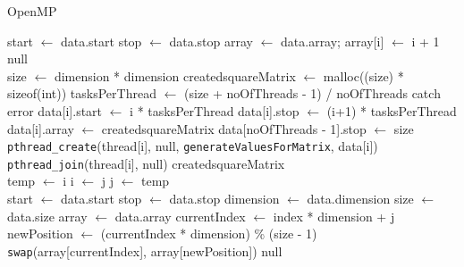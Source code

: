 \documentclass[10pt,twocolumn]{witseiepaper}
\begin{document}
\begin{appendix}
\begin{algorithm}[htbp]
\begin{algorithmic}
		\caption{OpenMP}
		\label{alg:1}
	\end{algorithmic}
\end{algorithm}

\begin{algorithm}[htbp]
	\begin{algorithmic}
		\State start $\leftarrow$ data.start
		\State stop $\leftarrow$ data.stop
		\State array $\leftarrow$ data.array;
		\State array[i] $\leftarrow$ i + 1
		\EndFor
		\State \Return null
		\EndFunction \\
		
		\State size $\leftarrow$ dimension * dimension
		\State created\textunderscore squareMatrix $\leftarrow$ malloc((size) * sizeof(int))
		\State tasksPerThread $\leftarrow$ (size + noOfThreads - 1) / noOfThreads
		\State catch error
		\EndIf
		\State data[i].start $\leftarrow$ i * tasksPerThread
		\State data[i].stop $\leftarrow$ (i+1) * tasksPerThread
		\State data[i].array $\leftarrow$ created\textunderscore squareMatrix
		\EndFor
		\State data[noOfThreads - 1].stop $\leftarrow$ size
		\State  \verb|pthread_create|(thread[i], null, \verb|generateValuesForMatrix|, data[i])
		\EndFor
		\State  \verb|pthread_join|(thread[i], null)
		\EndFor
		\EndFunction
		\State \Return created\textunderscore squareMatrix \\
		
		\State temp $\leftarrow$ i
		\State i $\leftarrow$ j
		\State j $\leftarrow$ temp
		\EndFunction \\
		
		\State start $\leftarrow$ data.start
		\State stop $\leftarrow$ data.stop
		\State dimension $\leftarrow$ data.dimension
		\State size $\leftarrow$ data.size
		\State array $\leftarrow$ data.array
		\State currentIndex $\leftarrow$ index * dimension + j
		\State newPosition $\leftarrow$ (currentIndex * dimension) \% (size - 1)
		\State \verb|swap|(array[currentIndex], array[newPosition])
		\EndFor
		\EndFor
		\State \Return null
		\EndFunction \\
		

\end{algorithmic}
\end{algorithm}
\end{appendix}
\end{document}
